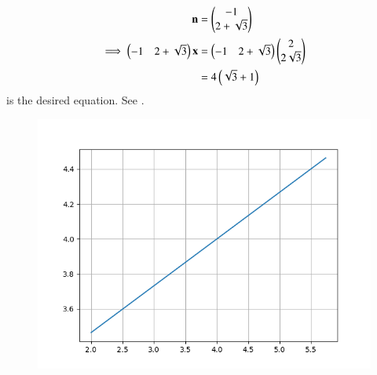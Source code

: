     \begin{align}
	    \mathbf{n} &= \begin{pmatrix}-1\\2+\sqrt{3}\end{pmatrix}
        \label{eq:11/10/2/4normal-vec}
	\\
        \implies \begin{pmatrix}-1&2+\sqrt{3}\end{pmatrix}\mathbf{x} &=\begin{pmatrix}-1&2+\sqrt{3}\end{pmatrix}\begin{pmatrix}2\\2\sqrt{3}\end{pmatrix}  
	    \\
	    &= 4\left(\sqrt{3}+1\right)
        \label{eq:11/10/2/4line}
    \end{align}
is the desired equation.  See .
    \begin{figure}[!ht]
        \centering
        \includegraphics[width=\columnwidth]{chapters/11/10/2/4/figs/line.png}
        \caption{}
        \label{fig:11/10/2/4line}
    \end{figure}

